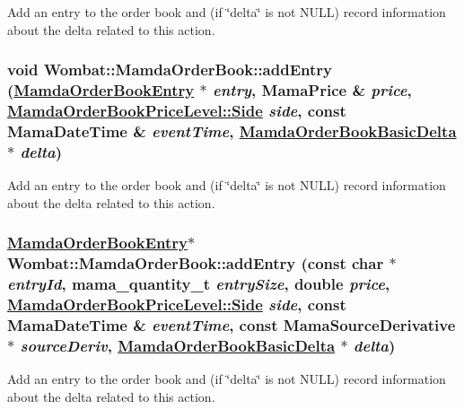 Add an entry to the order book and (if \char`\"{}delta\char`\"{} is not NULL) record information about the delta related to this action. 

\hypertarget{classWombat_1_1MamdaOrderBook_6ea5d90b33f32a292c02123ddbb30831}{
\subsubsection[addEntry]{\setlength{\rightskip}{0pt plus 5cm}void Wombat::Mamda\-Order\-Book::add\-Entry (\hyperlink{classWombat_1_1MamdaOrderBookEntry}{Mamda\-Order\-Book\-Entry} $\ast$ {\em entry}, Mama\-Price \& {\em price}, \hyperlink{classWombat_1_1MamdaOrderBookPriceLevel_384c34b0a74d874b8969dee9b0d3718d}{Mamda\-Order\-Book\-Price\-Level::Side} {\em side}, const Mama\-Date\-Time \& {\em event\-Time}, \hyperlink{classWombat_1_1MamdaOrderBookBasicDelta}{Mamda\-Order\-Book\-Basic\-Delta} $\ast$ {\em delta})}}
\label{classWombat_1_1MamdaOrderBook_6ea5d90b33f32a292c02123ddbb30831}


Add an entry to the order book and (if \char`\"{}delta\char`\"{} is not NULL) record information about the delta related to this action. 

\hypertarget{classWombat_1_1MamdaOrderBook_3bb82a1c36ba5d6c1db3fc14e10e2272}{
\subsubsection[addEntry]{\setlength{\rightskip}{0pt plus 5cm}\hyperlink{classWombat_1_1MamdaOrderBookEntry}{Mamda\-Order\-Book\-Entry}$\ast$ Wombat::Mamda\-Order\-Book::add\-Entry (const char $\ast$ {\em entry\-Id}, mama\_\-quantity\_\-t {\em entry\-Size}, double {\em price}, \hyperlink{classWombat_1_1MamdaOrderBookPriceLevel_384c34b0a74d874b8969dee9b0d3718d}{Mamda\-Order\-Book\-Price\-Level::Side} {\em side}, const Mama\-Date\-Time \& {\em event\-Time}, const Mama\-Source\-Derivative $\ast$ {\em source\-Deriv}, \hyperlink{classWombat_1_1MamdaOrderBookBasicDelta}{Mamda\-Order\-Book\-Basic\-Delta} $\ast$ {\em delta})}}
\label{classWombat_1_1MamdaOrderBook_3bb82a1c36ba5d6c1db3fc14e10e2272}


Add an entry to the order book and (if \char`\"{}delta\char`\"{} is not NULL) record information about the delta related to this action. 

